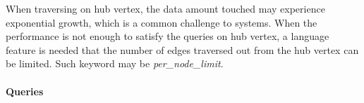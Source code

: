 
When traversing on hub vertex, the data amount touched may experience exponential growth, which is a common challenge to systems. When the performance is not enough to satisfy the queries on hub vertex, a language feature is needed that the number of edges traversed out from the hub vertex can be limited. Such keyword may be \emph{per\_node\_limit}.


\paragraph{Queries}
{\raggedright

}